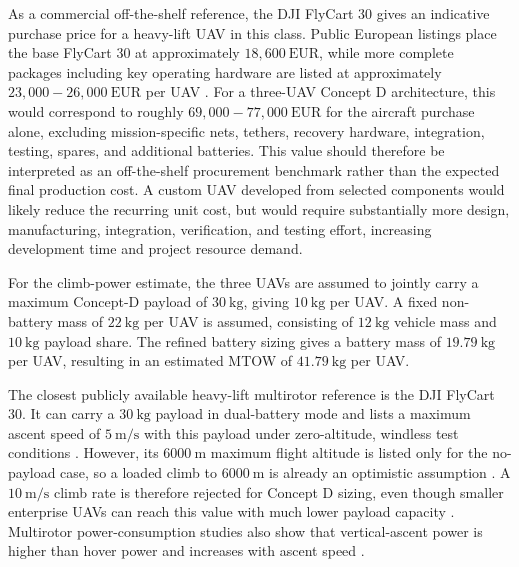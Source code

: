 As a commercial off-the-shelf reference, the DJI FlyCart 30 gives an indicative purchase price for a heavy-lift UAV in this class. Public European listings place the base FlyCart 30 at approximately \(18{,}600~\mathrm{EUR}\), while more complete packages including key operating hardware are listed at approximately \(23{,}000{-}26{,}000~\mathrm{EUR}\) per UAV \cite{COPTERS.EU2026DJI30,DigitalAgro2026DJI30}. For a three-UAV Concept D architecture, this would correspond to roughly \(69{,}000{-}77{,}000~\mathrm{EUR}\) for the aircraft purchase alone, excluding mission-specific nets, tethers, recovery hardware, integration, testing, spares, and additional batteries. This value should therefore be interpreted as an off-the-shelf procurement benchmark rather than the expected final production cost. A custom UAV developed from selected components would likely reduce the recurring unit cost, but would require substantially more design, manufacturing, integration, verification, and testing effort, increasing development time and project resource demand.



For the climb-power estimate, the three UAVs are assumed to jointly carry a maximum Concept-D payload of \(30~\mathrm{kg}\), giving \(10~\mathrm{kg}\) per UAV. A fixed non-battery mass of \(22~\mathrm{kg}\) per UAV is assumed, consisting of \(12~\mathrm{kg}\) vehicle mass and \(10~\mathrm{kg}\) payload share. The refined battery sizing gives a battery mass of \(19.79~\mathrm{kg}\) per UAV, resulting in an estimated MTOW of \(41.79~\mathrm{kg}\) per UAV.

The closest publicly available heavy-lift multirotor reference is the DJI FlyCart 30. It can carry a \(30~\mathrm{kg}\) payload in dual-battery mode and lists a maximum ascent speed of \(5~\mathrm{m/s}\) with this payload under zero-altitude, windless test conditions \cite{DJI2026DJISpecifications}. However, its \(6000~\mathrm{m}\) maximum flight altitude is listed only for the no-payload case, so a loaded climb to \(6000~\mathrm{m}\) is already an optimistic assumption \cite{DJI2026DJISpecifications}. A \(10~\mathrm{m/s}\) climb rate is therefore rejected for Concept D sizing, even though smaller enterprise UAVs can reach this value with much lower payload capacity \cite{DJI2026DJISpecificationsd}. Multirotor power-consumption studies also show that vertical-ascent power is higher than hover power and increases with ascent speed \cite{Gong2022ModellingUAVs}.


